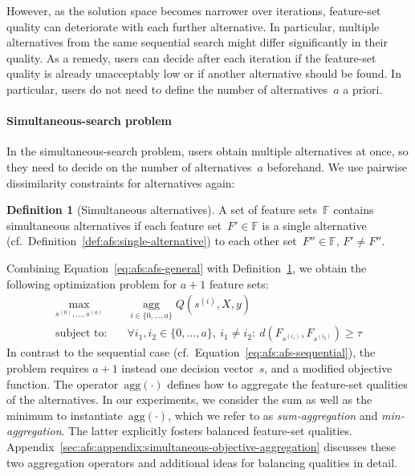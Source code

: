\documentclass{article}
\theoremstyle{definition}
\newtheorem{definition}{Definition}
\begin{document}
However, as the solution space becomes narrower over iterations, feature-set quality can deteriorate with each further alternative.
In particular, multiple alternatives from the same sequential search might differ significantly in their quality.
As a remedy, users can decide after each iteration if the feature-set quality is already unacceptably low or if another alternative should be found.
In particular, users do not need to define the number of alternatives~$a$ a priori.

\paragraph{Simultaneous-search problem}

In the simultaneous-search problem, users obtain multiple alternatives at once, so they need to decide on the number of alternatives~$a$ beforehand.
We use pairwise dissimilarity constraints for alternatives again:
%
\begin{definition}[Simultaneous alternatives]
	A set of feature sets~$\mathbb{F}$ contains simultaneous alternatives if each feature set~$F' \in \mathbb{F}$ is a single alternative (cf.~Definition~\ref{def:afs:single-alternative}) to each other set~$F'' \in \mathbb{F}$, $F' \neq F''$.
	\label{def:afs:simultaneous-alternative}
\end{definition}
%
Combining Equation~\ref{eq:afs:afs-general} with Definition~\ref{def:afs:simultaneous-alternative}, we obtain the following optimization problem for $a+1$ feature sets:
%
\begin{equation}
	\begin{aligned}
		\max_{s^{(0)}, \dots, s^{(a)}} &\quad \operatorname*{agg}_{i \in \{0, \dots, a\}} Q(s^{(i)},X,y) \\
		\text{subject to:} &\quad \forall i_1, i_2 \in \{0, \dots, a\},~i_1 \neq i_2:~d(F_{s^{(i_1)}},F_{s^{(i_2)}}) \geq \tau
	\end{aligned}
	\label{eq:afs:afs-simultaneous}
\end{equation}
%
In contrast to the sequential case (cf.~Equation~\ref{eq:afs:afs-sequential}), the problem requires $a+1$ instead one decision vector~$s$, and a modified objective function.
The operator~$\text{agg}(\cdot)$ defines how to aggregate the feature-set qualities of the alternatives.
In our experiments, we consider the sum as well as the minimum to instantiate~$\text{agg}(\cdot)$, which we refer to as \emph{sum-aggregation} and \emph{min-aggregation}.
The latter explicitly fosters balanced feature-set qualities.
Appendix~\ref{sec:afs:appendix:simultaneous-objective-aggregation} discusses these two aggregation operators and additional ideas for balancing qualities in detail.
\end{document}
